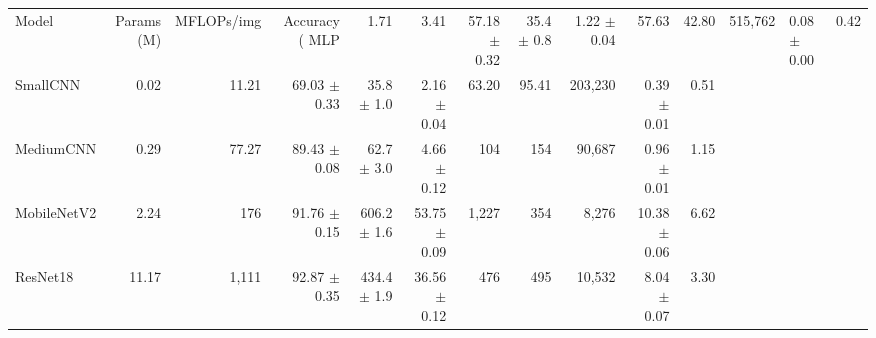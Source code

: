\begin{tabular}{lrrrrrrrrrr}
\hline
Model & Params (M) & MFLOPs/img & Accuracy (%
\hline
MLP & 1.71 & 3.41 & 57.18 $\pm$ 0.32 & 35.4 $\pm$ 0.8 & 1.22 $\pm$ 0.04 & 57.63 & 42.80 & 515,762 & 0.08 $\pm$ 0.00 & 0.42 \\
SmallCNN & 0.02 & 11.21 & 69.03 $\pm$ 0.33 & 35.8 $\pm$ 1.0 & 2.16 $\pm$ 0.04 & 63.20 & 95.41 & 203,230 & 0.39 $\pm$ 0.01 & 0.51 \\
MediumCNN & 0.29 & 77.27 & 89.43 $\pm$ 0.08 & 62.7 $\pm$ 3.0 & 4.66 $\pm$ 0.12 & 104 & 154 & 90,687 & 0.96 $\pm$ 0.01 & 1.15 \\
MobileNetV2 & 2.24 & 176 & 91.76 $\pm$ 0.15 & 606.2 $\pm$ 1.6 & 53.75 $\pm$ 0.09 & 1,227 & 354 & 8,276 & 10.38 $\pm$ 0.06 & 6.62 \\
ResNet18 & 11.17 & 1,111 & 92.87 $\pm$ 0.35 & 434.4 $\pm$ 1.9 & 36.56 $\pm$ 0.12 & 476 & 495 & 10,532 & 8.04 $\pm$ 0.07 & 3.30 \\
\hline
\end{tabular}